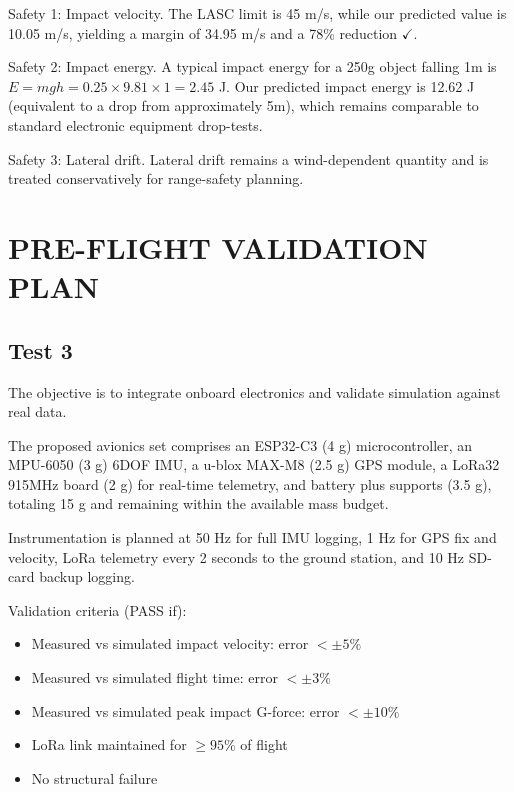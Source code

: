 \documentclass[12pt,a4paper]{article}
\begin{document}
Safety 1: Impact velocity.
The LASC limit is 45 m/s, while our predicted value is 10.05 m/s, yielding a margin of 34.95 m/s and a 78\% reduction $\checkmark$.

Safety 2: Impact energy.
A typical impact energy for a 250g object falling 1m is $E = mgh = 0.25 \times 9.81 \times 1 = 2.45$ J. Our predicted impact energy is 12.62 J (equivalent to a drop from approximately 5m), which remains comparable to standard electronic equipment drop-tests.

Safety 3: Lateral drift.
Lateral drift remains a wind-dependent quantity and is treated conservatively for range-safety planning.

\vspace{0.5em}

\section{PRE-FLIGHT VALIDATION PLAN}
\label{sec:preflight-validation}

\subsection{Test 3}

The objective is to integrate onboard electronics and validate simulation against real data.

The proposed avionics set comprises an ESP32-C3 (4 g) microcontroller, an MPU-6050 (3 g) 6DOF IMU, a u-blox MAX-M8 (2.5 g) GPS module, a LoRa32 915MHz board (2 g) for real-time telemetry, and battery plus supports (3.5 g), totaling 15 g and remaining within the available mass budget.

Instrumentation is planned at 50 Hz for full IMU logging, 1 Hz for GPS fix and velocity, LoRa telemetry every 2 seconds to the ground station, and 10 Hz SD-card backup logging.

Validation criteria (PASS if):
\begin{itemize}
    \item Measured vs simulated impact velocity: error $< \pm5\%$
    \item Measured vs simulated flight time: error $< \pm3\%$
    \item Measured vs simulated peak impact G-force: error $< \pm10\%$
    \item LoRa link maintained for $\geq 95\%$ of flight
    \item No structural failure
\end{itemize}
\end{document}
